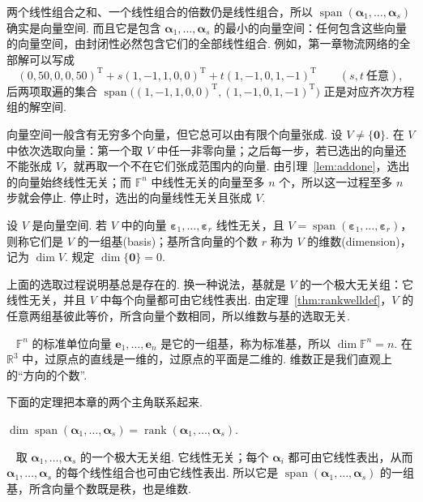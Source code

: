 \documentclass[lang=cn,10.5pt,scheme=chinese,toc=twocol,section,chinesefont=nofont,
twoside,citestyle=gb7714-2015,bibstyle=gb7714-2015]{elegantbook}
\DeclareRobustCommand{\textbf}[1]{{\lnsemiboldlatin\lnsemiboldcjk #1}}
\newcommand{\vv}[1]{\boldsymbol{#1}}
\newcommand{\zero}{\boldsymbol{0}}          %
\newcommand{\trans}{\mathrm{T}}             %
\numberwithin{equation}{section}   %
\newcommand{\spn}{\operatorname{span}}      %
\newcommand{\rk}{\operatorname{rank}}       %
\newcommand*{\lnlabel}[1]{{\sffamily\bfseries\color{black}#1}}
\renewenvironment{example}[1][]{%
	\refstepcounter{exam}%
	\par\noindent\lnlabel{\examplename\ \theexam\ifblank{#1}{}{\ #1}}\ \rmfamily}{%
	\par\ignorespacesafterend}
\renewenvironment{proof}{%
	\par\noindent\lnlabel{\proofname}\;\ \color{black!90}\cfs}{\par}
\begin{document}
两个线性组合之和、一个线性组合的倍数仍是线性组合，所以 $\spn(\vv\alpha_1,\ldots,\vv\alpha_s)$ 确实是向量空间. 而且它是包含 $\vv\alpha_1,\ldots,\vv\alpha_s$ 的\textbf{最小}的向量空间：任何包含这些向量的向量空间，由封闭性必然包含它们的全部线性组合. 例如，第一章物流网络的全部解可以写成
\[
  (0,50,0,0,50)^\trans+s(1,-1,1,0,0)^\trans+t(1,-1,0,1,-1)^\trans\qquad(s,t\ \text{任意}),
\]
后两项取遍的集合 $\spn\big((1,-1,1,0,0)^\trans,(1,-1,0,1,-1)^\trans\big)$ 正是对应齐次方程组的解空间.

向量空间一般含有无穷多个向量，但它总可以由有限个向量张成. 设 $V\ne\{\zero\}$. 在 $V$ 中依次选取向量：第一个取 $V$ 中任一非零向量；之后每一步，若已选出的向量还不能张成 $V$，就再取一个不在它们张成范围内的向量. 由引理~\ref{lem:addone}，选出的向量始终线性无关；而 $\mathbb{F}^n$ 中线性无关的向量至多 $n$ 个，所以这一过程至多 $n$ 步就会停止. 停止时，选出的向量线性无关且张成 $V$.

\begin{definition}
  \label{def:vecbasis}
  设 $V$ 是向量空间. 若 $V$ 中的向量 $\vv\varepsilon_1,\ldots,\vv\varepsilon_r$ 线性无关，且 $V=\spn(\vv\varepsilon_1,\ldots,\vv\varepsilon_r)$，则称它们是 $V$ 的一组\textbf{基}(basis)；基所含向量的个数 $r$ 称为 $V$ 的\textbf{维数}(dimension)，记为 $\dim V$. 规定 $\dim\{\zero\}=0$.
\end{definition}

上面的选取过程说明基总是存在的. 换一种说法，基就是 $V$ 的一个极大无关组：它线性无关，并且 $V$ 中每个向量都可由它线性表出. 由定理~\ref{thm:rankwelldef}，$V$ 的任意两组基彼此等价，所含向量个数相同，所以维数与基的选取无关.

\begin{example}
  $\mathbb{F}^n$ 的标准单位向量 $\vv e_1,\ldots,\vv e_n$ 是它的一组基，称为\textbf{标准基}，所以 $\dim\mathbb{F}^n=n$. 在 $\mathbb{R}^3$ 中，过原点的直线是一维的，过原点的平面是二维的. 维数正是我们直观上的“方向的个数”.
\end{example}

下面的定理把本章的两个主角联系起来.

\begin{theorem}
  \label{thm:dimrank}
  $\dim\spn(\vv\alpha_1,\ldots,\vv\alpha_s)=\rk(\vv\alpha_1,\ldots,\vv\alpha_s)$.
\end{theorem}
\begin{proof}
  取 $\vv\alpha_1,\ldots,\vv\alpha_s$ 的一个极大无关组. 它线性无关；每个 $\vv\alpha_i$ 都可由它线性表出，从而 $\vv\alpha_1,\ldots,\vv\alpha_s$ 的每个线性组合也可由它线性表出. 所以它是 $\spn(\vv\alpha_1,\ldots,\vv\alpha_s)$ 的一组基，所含向量个数既是秩，也是维数.
\end{proof}
\end{document}
